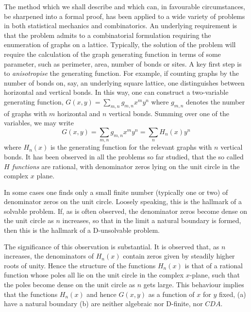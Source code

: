 The method which we shall describe and which can, in favourable circumstances,
be sharpened
into a formal proof, has been applied to a wide variety of
problems in both statistical mechanics and combinatorics. An
underlying requirement is that the problem admits to a
combinatorial formulation requiring the enumeration of graphs
on a lattice.
Typically, the solution of the problem will require the calculation
of the graph generating function in terms of some parameter,
such as perimeter, area, number of bonds or sites. A key first step is to
{\em anisotropise} the generating function. For example, if
counting graphs by the number of bonds on, say, an underlying
square lattice, one distinguishes between horizontal and vertical bonds.
In this way, one can construct a two-variable generating function,
$G(x,y) = \sum_{m,n} g_{m,n} x^m y^n$ where $g_{m,n}$ denotes
the number of graphs with $m$ horizontal and $n$ vertical bonds.
Summing over one of the variables, we may write
\begin{equation}
G(x,y) = \sum_{m,n} g_{m,n} x^m y^n = \sum_n H_n(x) y^n 
\end{equation}
where $H_n(x)$ is the generating function for the relevant
graphs with $n$ vertical bonds. It has been observed in all
the problems so far studied, that the so called {\em $H$ functions}
are rational, with denominator zeros lying on the unit circle in 
the complex $x$ plane.

In some cases one finds only a small finite number (typically
one or two) of denominator zeros on the unit circle. Loosely
speaking, this is the hallmark of a solvable problem. If, as is
often observed, the denominator zeros become dense on the unit circle
as $n$ increases, so that in the limit a natural boundary
is formed, then this is the hallmark of a D-unsolvable problem.

The significance of this observation is substantial. It is observed
 that, as
$n$ increases, the denominators of $H_n(x)$ contain zeros given by 
steadily higher roots of unity.  Hence
the structure of the functions $H_n(x)$ is that of a rational function
whose poles all lie on the unit circle in the complex $x$-plane, such
that the poles become dense on the unit circle as $n$ gets large. This
behaviour implies that the functions $H_n(x)$ and
hence $G(x,y)$ as a function of $x$ for $y$ fixed, (a) have a
natural boundary (b) are neither algebraic nor D-finite, nor $CDA.$

